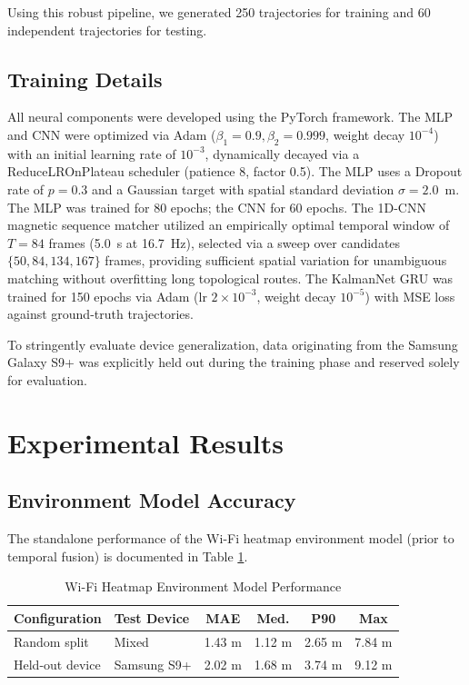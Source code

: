 \documentclass[conference]{IEEEtran}
\begin{document}
Using this robust pipeline, we generated 250 trajectories for training and 60 independent trajectories for testing.

\subsection{Training Details}

All neural components were developed using the PyTorch framework. The MLP and CNN were optimized via Adam ($\beta_1 = 0.9, \beta_2 = 0.999$, weight decay $10^{-4}$) with an initial learning rate of $10^{-3}$, dynamically decayed via a ReduceLROnPlateau scheduler (patience 8, factor 0.5). The MLP uses a Dropout rate of $p = 0.3$ and a Gaussian target with spatial standard deviation $\sigma = 2.0$~m. The MLP was trained for 80 epochs; the CNN for 60 epochs. The 1D-CNN magnetic sequence matcher utilized an empirically optimal temporal window of $T = 84$ frames (5.0~s at 16.7~Hz), selected via a sweep over candidates $\{50, 84, 134, 167\}$ frames, providing sufficient spatial variation for unambiguous matching without overfitting long topological routes. The KalmanNet GRU was trained for 150 epochs via Adam (lr $2 \times 10^{-3}$, weight decay $10^{-5}$) with MSE loss against ground-truth trajectories.

To stringently evaluate device generalization, data originating from the Samsung Galaxy S9+ was explicitly held out during the training phase and reserved solely for evaluation.

\section{Experimental Results}\label{sec:results}

\subsection{Environment Model Accuracy}

The standalone performance of the Wi-Fi heatmap environment model (prior to temporal fusion) is documented in Table \ref{tab:wifi_heatmap}. 

\begin{table}[htbp]
\caption{Wi-Fi Heatmap Environment Model Performance}
\label{tab:wifi_heatmap}
\centering
\begin{tabular}{@{}llcccc@{}}
\toprule
\textbf{Configuration} & \textbf{Test Device} & \textbf{MAE} & \textbf{Med.} & \textbf{P90} & \textbf{Max} \\ \midrule
Random split & Mixed & 1.43 m & 1.12 m & 2.65 m & 7.84 m \\
Held-out device & Samsung S9+ & 2.02 m & 1.68 m & 3.74 m & 9.12 m \\ \bottomrule
\end{tabular}
\end{table}
\end{document}
